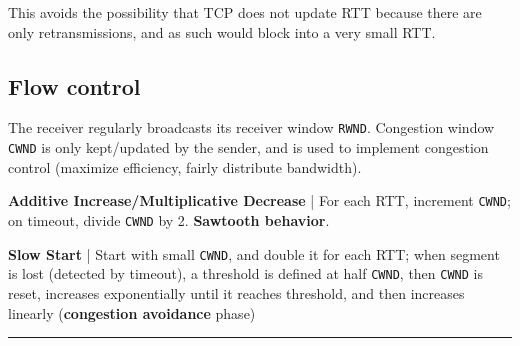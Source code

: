 \documentclass{form}
\begin{document}
\begin{minipage}[c]{0.39\textwidth}
    This avoids the possibility that TCP does not update RTT because there are only retransmissions, and as such would block into a very small RTT.

    \subsection*{Flow control}

    The receiver regularly broadcasts its receiver window \texttt{RWND}.
    Congestion window \texttt{CWND} is only kept/updated by the sender, and is used to implement congestion control (maximize efficiency, fairly distribute bandwidth).

    \textbf{Additive Increase/Multiplicative Decrease} |
    For each RTT, increment \texttt{CWND}; on timeout, divide \texttt{CWND} by 2. \textbf{Sawtooth behavior}.

    \textbf{Slow Start} | 
    Start with small \texttt{CWND}, and double it for each RTT; when segment is lost (detected by timeout), a threshold is defined at half \texttt{CWND}, then \texttt{CWND} is reset, increases exponentially until it reaches threshold, and then increases linearly (\textbf{congestion avoidance} phase)
\end{minipage}

\noindent\rule{\textwidth}{1.0pt}\vspace{-0em}
\end{document}
